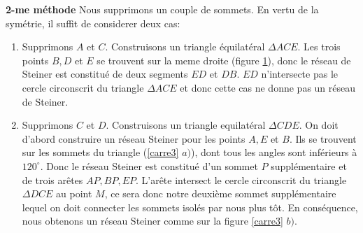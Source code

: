 \documentclass[10pt,a4paper]{article}%
\theoremstyle{theorem}
\theoremstyle{definition}
\begin{document}
         	\textbf{2-me méthode} Nous supprimons un couple de sommets. En vertu de la symétrie, il suffit de considerer deux cas: 
         		\begin{enumerate}
         			\item Supprimons $A$ et $C$. Construisons un triangle équilatéral $\Delta ACE$. Les trois points $B, D$ et $E$ se trouvent sur la meme droite (figure \ref{carre2}), donc le réseau de Steiner est constitué de deux  segments $ED$ et $DB$. $ED$ n'intersecte pas le cercle circonscrit du triangle $\Delta ACE$ et donc cette cas ne donne pas un réseau de Steiner.
         				\begin{figure}[h]
         					\begin{center}
         				\end{center}
         			\caption{}\label{carre2}
         				\end{figure}
         			\item Supprimons $C$ et $D$. Construisons un triangle equilatéral $\Delta CDE$. On doit d'abord construire un réseau Steiner pour les points $A, E$ et $B$. Ils se trouvent sur les sommets du triangle (\ref{carre3} $a)$), dont tous les angles sont inférieurs à $120^\circ$. Donc le réseau Steiner est constitué d'un sommet $P$ supplémentaire et de trois arêtes $AP,BP,EP$. L'arête intersect le cercle circonscrit du triangle $\Delta DCE$ au point $M$, ce sera donc notre deuxième sommet supplémentaire lequel on doit connecter les sommets isolés par nous plus tôt. En conséquence, nous obtenons un réseau Steiner comme sur la figure \ref{carre3} $b)$.
         			

\end{enumerate}
\end{document}
